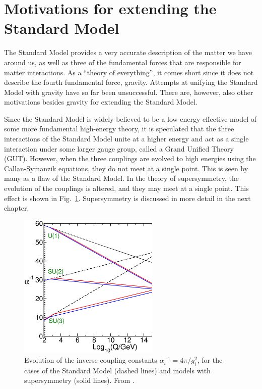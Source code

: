 \documentclass[twoside,english]{uiofysmaster}
\begin{document}
\section[Motivations for extending the Standard Model]{Motivations for extending the\\ Standard Model}
\label{sec:motivations_for_extending_the_SM}
The Standard Model provides a very accurate description of the matter we have around us, as well as three of the fundamental forces that are responsible for matter interactions. As a ``theory of everything'', it comes short since it does not describe the fourth fundamental force, gravity. Attempts at unifying the Standard Model with gravity have so far been unsuccessful. There are, however, also other motivations besides gravity for extending the Standard Model.

Since the Standard Model is widely believed to be a low-energy effective model of some more fundamental high-energy theory, it is speculated that the three interactions of the Standard Model unite at a higher energy and act as a single interaction under some larger gauge group, called a Grand Unified Theory (GUT). However, when the three couplings are evolved to high energies using the Callan-Symanzik equations, they do not meet at a single point. This is seen by many as a flaw of the Standard Model. In the theory of supersymmetry, the evolution of the couplings is altered, and they may meet at a single point. This effect is shown in Fig.\ \ref{fig:coupling_unification}. Supersymmetry is discussed in more detail in the next chapter.
\begin{figure}[hbt]
	\centering
	\includegraphics[width=0.6\textwidth]{figures/susyintro/unification.eps}
	\caption{Evolution of the inverse coupling constants $\alpha^{-1}_i = 4\pi/g^2_i$, for the cases of the Standard Model (dashed lines) and models with supersymmetry (solid lines). From \cite{Martin:1997ns}.}
	\label{fig:coupling_unification}
\end{figure}
\end{document}
